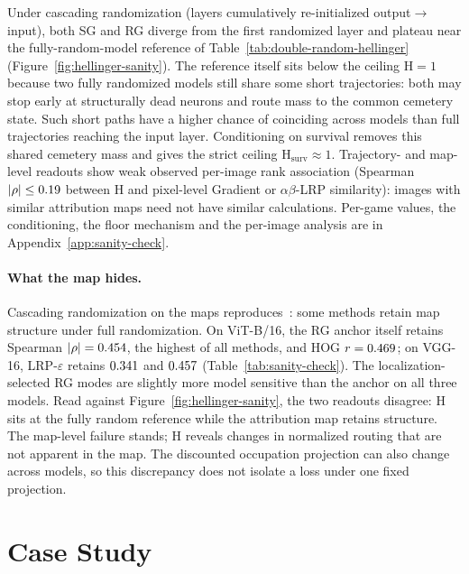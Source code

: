 \documentclass[twoside]{article}
\newif\ifch \chfalse
\newcommand{\ch}[1]{\ifch\textcolor{magenta}{#1}\else#1\fi}
\newcommand{\1}{\mathbf{1}}
\begin{document}
Under cascading randomization (layers cumulatively re-initialized output$\to$input), both \ac{SG}
and \ac{RG} diverge from the first randomized layer and plateau near the fully-random-model
reference of Table~\ref{tab:double-random-hellinger} (Figure~\ref{fig:hellinger-sanity}). The
reference itself sits below the ceiling $\mathrm{H}=1$ because two fully randomized models still
share some short trajectories: both may stop early at structurally dead neurons and route mass to
the common cemetery state. Such short paths have a higher chance of coinciding across models than
full trajectories reaching the input layer. Conditioning on survival removes this shared cemetery
mass and gives the strict ceiling $\mathrm{H}_{\mathrm{surv}} \approx 1$. Trajectory- and map-level
readouts show weak observed per-image rank association (Spearman $|\rho|\le 0.19$ between $\mathrm{H}$ and
pixel-level Gradient or $\alpha\beta$-\ac{LRP} similarity): images with similar attribution maps
need not have similar calculations. Per-game values, the conditioning, the floor mechanism and the
per-image analysis are in Appendix~\ref{app:sanity-check}.

\paragraph{What the map hides.}\label{sec:pixel-sanity}
Cascading randomization on the maps reproduces~\citet{Adebayo2018sanity,
sixt2020whenexplanationslie}: some methods retain map structure under full randomization. On
ViT-B/16, the \ac{RG} anchor itself retains Spearman $|\rho| = 0.454$, the highest
of all methods, and HOG $r = 0.469$; on VGG-16, LRP-$\varepsilon$ retains
$0.341$ and $0.457$ (Table~\ref{tab:sanity-check}). The
localization-selected \ac{RG} modes are slightly more model sensitive than the anchor on all three
models. \ch{Read against Figure~\ref{fig:hellinger-sanity}, the two readouts disagree: $\mathrm{H}$ sits at
the fully random reference while the attribution map retains structure. The map-level failure stands;
$\mathrm{H}$ reveals changes in normalized routing that are not apparent in the map. The discounted
occupation projection can also change across models, so this discrepancy does not isolate a loss
under one fixed projection.}
\section{Case Study}\label{sec:experiments}\label{sec:case-study}
\end{document}
